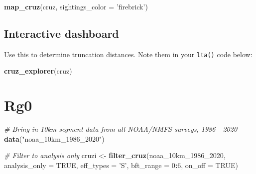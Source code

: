 \documentclass[
]{book}
\newenvironment{Shaded}{\begin{snugshade}}{\end{snugshade}}
\newcommand{\CommentTok}[1]{\textcolor[rgb]{0.56,0.35,0.01}{\textit{#1}}}
\newcommand{\DataTypeTok}[1]{\textcolor[rgb]{0.13,0.29,0.53}{#1}}
\newcommand{\DecValTok}[1]{\textcolor[rgb]{0.00,0.00,0.81}{#1}}
\newcommand{\KeywordTok}[1]{\textcolor[rgb]{0.13,0.29,0.53}{\textbf{#1}}}
\newcommand{\NormalTok}[1]{#1}
\newcommand{\OperatorTok}[1]{\textcolor[rgb]{0.81,0.36,0.00}{\textbf{#1}}}
\newcommand{\OtherTok}[1]{\textcolor[rgb]{0.56,0.35,0.01}{#1}}
\newcommand{\StringTok}[1]{\textcolor[rgb]{0.31,0.60,0.02}{#1}}
\begin{document}
\begin{Shaded}
\begin{Highlighting}[]
\KeywordTok{map_cruz}\NormalTok{(cruz, }\DataTypeTok{sightings_color =} \StringTok{'firebrick'}\NormalTok{)}
\end{Highlighting}
\end{Shaded}

\hypertarget{interactive-dashboard-2}{%
\subsection*{Interactive dashboard}\label{interactive-dashboard-2}}

Use this to determine truncation distances. Note them in your \texttt{lta()} code below:

\begin{Shaded}
\begin{Highlighting}[]
\KeywordTok{cruz_explorer}\NormalTok{(cruz)}
\end{Highlighting}
\end{Shaded}

\hypertarget{rg0-2}{%
\section*{Rg0}\label{rg0-2}}

\begin{Shaded}
\begin{Highlighting}[]
\CommentTok{# Bring in 10km-segment data from all NOAA/NMFS surveys, 1986 - 2020}
\KeywordTok{data}\NormalTok{(}\StringTok{"noaa_10km_1986_2020"}\NormalTok{)}
\end{Highlighting}
\end{Shaded}

\begin{Shaded}
\begin{Highlighting}[]
\CommentTok{# Filter to analysis only}
\NormalTok{cruzi <-}\StringTok{ }\KeywordTok{filter_cruz}\NormalTok{(noaa_10km_}\DecValTok{1986}\NormalTok{_}\DecValTok{2020}\NormalTok{,}
                     \DataTypeTok{analysis_only =} \OtherTok{TRUE}\NormalTok{,}
                     \DataTypeTok{eff_types =} \StringTok{'S'}\NormalTok{,}
                     \DataTypeTok{bft_range =} \DecValTok{0}\OperatorTok{:}\DecValTok{6}\NormalTok{,}
                     \DataTypeTok{on_off =} \OtherTok{TRUE}\NormalTok{)}
\end{Highlighting}
\end{Shaded}
\end{document}

